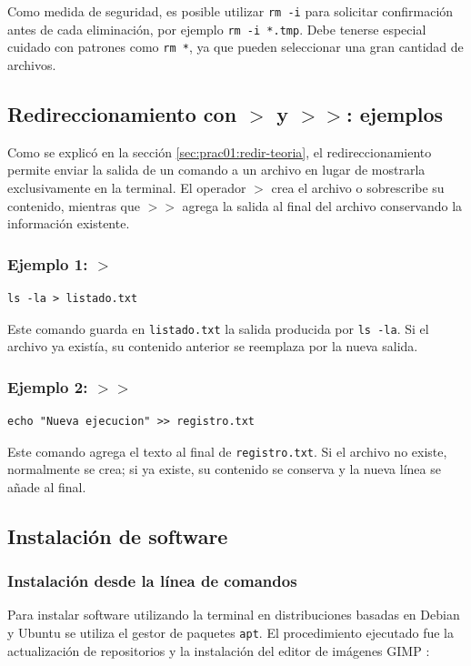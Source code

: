 Como medida de seguridad, es posible utilizar \texttt{rm -i} para solicitar confirmación antes de cada eliminación, por ejemplo \texttt{rm -i *.tmp}. Debe tenerse especial cuidado con patrones como \texttt{rm *}, ya que pueden seleccionar una gran cantidad de archivos.

\subsection{Redireccionamiento con \ensuremath{>} y \ensuremath{>>}: ejemplos}
Como se explicó en la sección \ref{sec:prac01:redir-teoria}, el redireccionamiento permite enviar la salida de un comando a un archivo en lugar de mostrarla exclusivamente en la terminal. El operador \ensuremath{>} crea el archivo o sobrescribe su contenido, mientras que \ensuremath{>>} agrega la salida al final del archivo conservando la información existente.

\subsubsection{Ejemplo 1: \ensuremath{>}}
\begin{lstlisting}
ls -la > listado.txt
\end{lstlisting}
Este comando guarda en \texttt{listado.txt} la salida producida por \texttt{ls -la}. Si el archivo ya existía, su contenido anterior se reemplaza por la nueva salida.

\subsubsection{Ejemplo 2: \ensuremath{>>}}
\begin{lstlisting}
echo "Nueva ejecucion" >> registro.txt
\end{lstlisting}
Este comando agrega el texto al final de \texttt{registro.txt}. Si el archivo no existe, normalmente se crea; si ya existe, su contenido se conserva y la nueva línea se añade al final.


\subsection{Instalación de software}

\subsubsection{Instalación desde la línea de comandos}
Para instalar software utilizando la terminal en distribuciones basadas en Debian y Ubuntu se utiliza el gestor de paquetes \texttt{apt}. El procedimiento ejecutado fue la actualización de repositorios y la instalación del editor de imágenes GIMP \cite{debian:apt-manual:2023}:

